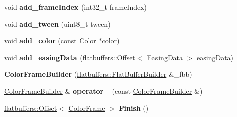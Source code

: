 \begin{DoxyCompactItemize}
\item 
\mbox{\label{structflatbuffers_1_1ColorFrameBuilder_ae643c91dd34e4b64c85ef66de8e33a16}} 
void {\bfseries add\+\_\+frame\+Index} (int32\+\_\+t frame\+Index)
\item 
\mbox{\label{structflatbuffers_1_1ColorFrameBuilder_a0dbeb657cbf199a4ce151bc54f8060ea}} 
void {\bfseries add\+\_\+tween} (uint8\+\_\+t tween)
\item 
\mbox{\label{structflatbuffers_1_1ColorFrameBuilder_ac8dfdc91477bd4494d5e560b8e27aa57}} 
void {\bfseries add\+\_\+color} (const Color $\ast$color)
\item 
\mbox{\label{structflatbuffers_1_1ColorFrameBuilder_a7bd0cd0a6ac36772ad4ebebce39cf50e}} 
void {\bfseries add\+\_\+easing\+Data} (\hyperlink{structflatbuffers_1_1Offset}{flatbuffers\+::\+Offset}$<$ \hyperlink{structflatbuffers_1_1EasingData}{Easing\+Data} $>$ easing\+Data)
\item 
\mbox{\label{structflatbuffers_1_1ColorFrameBuilder_a582544dd1db8701b7c53b2561e46c9bc}} 
{\bfseries Color\+Frame\+Builder} (\hyperlink{classflatbuffers_1_1FlatBufferBuilder}{flatbuffers\+::\+Flat\+Buffer\+Builder} \&\+\_\+fbb)
\item 
\mbox{\label{structflatbuffers_1_1ColorFrameBuilder_a20e65ea1c34348157fe4f8037efdd222}} 
\hyperlink{structflatbuffers_1_1ColorFrameBuilder}{Color\+Frame\+Builder} \& {\bfseries operator=} (const \hyperlink{structflatbuffers_1_1ColorFrameBuilder}{Color\+Frame\+Builder} \&)
\item 
\mbox{\label{structflatbuffers_1_1ColorFrameBuilder_a4faf164012313823c3d9f696cbc886c3}} 
\hyperlink{structflatbuffers_1_1Offset}{flatbuffers\+::\+Offset}$<$ \hyperlink{structflatbuffers_1_1ColorFrame}{Color\+Frame} $>$ {\bfseries Finish} ()
\end{DoxyCompactItemize}
